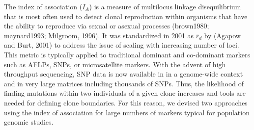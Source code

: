 \documentclass{frontiersSCNS} %
\begin{document}
The index of association (\(I_A\)) is a measure of multilocus linkage
disequilibrium that is most often used to detect clonal reproduction
within organisms that have the ability to reproduce via sexual or
asexual processes (brown1980; maynard1993; Milgroom, 1996). It was
standardized in 2001 as \(\bar{r}_d\) by (Agapow and Burt, 2001) to
address the issue of scaling with increasing number of loci. This metric
is typically applied to traditional dominant and co-dominant markers
such as AFLPs, SNPs, or microsatellite markers. With the advent of high
throughput sequencing, SNP data is now available in in a genome-wide
context and in very large matrices including thousands of SNPs. Thus,
the likelihood of finding mutations within two individuals of a given
clone increases and tools are needed for defining clone boundaries. For
this reason, we devised two approaches using the index of association
for large numbers of markers typical for population genomic studies.
\end{document}
